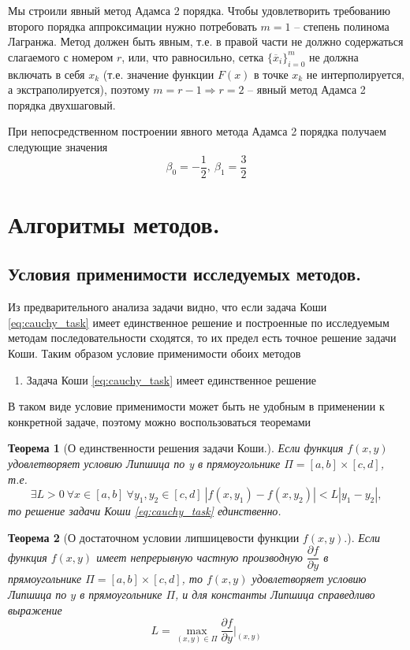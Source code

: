 \documentclass[a4paper, 12pt]{article}
\theoremstyle{mythm}
\newtheorem{theorem}{Теорема}
\begin{document}
	Мы строили явный метод Адамса 2 порядка. Чтобы удовлетворить требованию второго порядка аппроксимации нужно потребовать $m=1$ -- степень полинома Лагранжа. Метод должен быть явным, т.е. в правой части не должно содержаться слагаемого с номером $r$, или, что равносильно, сетка $\{\overline{x}_i\}_{i=0}^m$ не должна включать в себя $x_k$ (т.е. значение функции $F(x)$ в точке $x_k$ не интерполируется, а экстраполируется), поэтому $m=r-1\Rightarrow r=2$ -- явный метод Адамса 2 порядка двухшаговый. 
	
	При непосредственном построении явного метода Адамса 2 порядка получаем следующие значения
	\begin{equation}
		\beta_0 = -\dfrac{1}{2},\ \beta_1 = \dfrac{3}{2}
	\end{equation}

	\section{Алгоритмы методов.}
	
	\subsection{Условия применимости исследуемых методов.}
	
	Из предварительного анализа задачи видно, что если задача Коши \eqref{eq:cauchy_task} имеет единственное решение и построенные по исследуемым методам последовательности сходятся, то их предел есть точное решение задачи Коши. Таким образом условие применимости обоих методов
	\begin{enumerate}
		\item Задача Коши \eqref{eq:cauchy_task} имеет единственное решение
	\end{enumerate}

	В таком виде условие применимости может быть не удобным в применении к конкретной задаче, поэтому можно воспользоваться теоремами
	\begin{theorem}[О единственности решения задачи Коши.]
		Если функция $f(x,y)$ удовлетворяет условию Липшица по y в прямоугольнике $\Pi = [a, b] \times [c, d]$, т.е.
		\begin{equation}
			\exists L > 0\ \forall x \in [a,b]\ \forall y_1,y_2\in[c,d]\ |f(x,y_1) - f(x,y_2)| < L|y_1-y_2|,
		\end{equation} 
		то решение задачи Коши \eqref{eq:cauchy_task} единственно.
	\end{theorem}
	\begin{theorem}[О достаточном условии липшицевости функции $f(x,y)$.]
		Если функция $f(x,y)$ имеет непрерывную частную производную $\dfrac{\partial f}{\partial y}$ в прямоугольнике $\Pi = [a, b] \times [c, d]$, то $f(x,y)$ удовлетворяет условию Липшица по $y$ в прямоугольнике $\Pi$, и для константы Липшица справедливо выражение
		\begin{equation}
			L = \max\limits_{(x,y)\in \Pi}\dfrac{\partial f}{\partial y}\bigg|_{(x,y)}
		\end{equation}
	\end{theorem}
	
\end{document}
